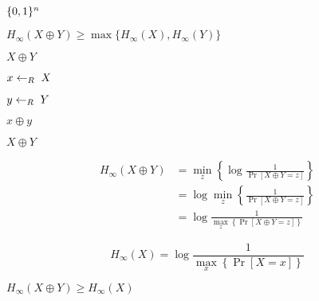 \documentclass[10pt]{book}
\begin{document}
\begin{mdSnippets}
\begin{mdInlineSnippet}[5867c9b098884eca2779f6d98d4b0b29]%
$\{0,1\}^n$\end{mdInlineSnippet}%
\begin{mdInlineSnippet}%
$H_{\infty}(X \oplus Y) \geq \max \{ H_{\infty}(X) , H_{\infty}(Y) \}$\end{mdInlineSnippet}%
\begin{mdInlineSnippet}%
$X\oplus Y$\end{mdInlineSnippet}%
\begin{mdInlineSnippet}[96eb03a6e185092bf6157c8d9516ad5e]%
$x\leftarrow_R\; X$\end{mdInlineSnippet}%
\begin{mdInlineSnippet}[01f76e562747b02b19054dc83c792eea]%
$y\leftarrow_R\; Y$\end{mdInlineSnippet}%
\begin{mdInlineSnippet}[788b7b4e233a635727354ee010f52e3d]%
$x\oplus y$\end{mdInlineSnippet}%
\begin{mdInlineSnippet}%
$X \oplus Y$\end{mdInlineSnippet}%
\begin{mdDisplaySnippet}[457eaf23d849b1445624ab0fb6b30959]%
\[%
\begin{aligned}
H_{\infty}(X \oplus Y) &= \min_z \left\{\log \frac{1}{\Pr[X \oplus Y = z]} \right\} \\
&= \log \min_z \left\{ \frac{1}{\Pr[X \oplus Y = z]}\right\} \\
&= \log \frac{1}{\max_z \left\{ \Pr[X \oplus Y = z]\right\}}
\end{aligned}
\]%
\end{mdDisplaySnippet}%
\begin{mdDisplaySnippet}[b0512d1763e20b75159c9b0d09b4d714]%
\[%
H_{\infty}(X) = \log \frac{1}{\max_x \left\{ \Pr[X = x] \right\}}
\]%
\end{mdDisplaySnippet}%
\begin{mdInlineSnippet}%
$H_{\infty}(X \oplus Y) \geq H_{\infty}(X)$\end{mdInlineSnippet}%

\end{mdSnippets}
\end{document}
